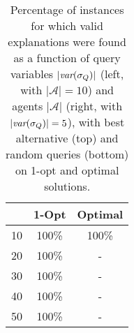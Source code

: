 \documentclass[twoside,11pt]{article}
\begin{document}
\begin{table}[t]
\begin{minipage}{0.30\textwidth}
\begin{tabular}{|c|cc|}
                              & \multicolumn{1}{c|}{\textbf{1-Opt}}   & \textbf{Optimal}   \\ \hline
10                            & \multicolumn{1}{c|}{100\%}     & 100\%        \\
20                            & \multicolumn{1}{c|}{100\%}     & -          \\
30                            & \multicolumn{1}{c|}{100\%}     & -          \\
40                            & \multicolumn{1}{c|}{100\%}     & -          \\
50                            & \multicolumn{1}{c|}{100\%}     & -          \\ \hline
\end{tabular}

\end{minipage}

\caption{Percentage of instances for which valid explanations were found as a function of query variables $|{\textit{var}(\sigma_Q)}|$ (left, with $|\mathcal{A}| = 10$) and agents $|\mathcal{A}|$ (right, with $|{\textit{var}(\sigma_Q)}| = 5$), with best alternative (top) and random queries (bottom) on 1-opt and optimal solutions.}


\label{tab:results}
\end{table}
\end{document}
